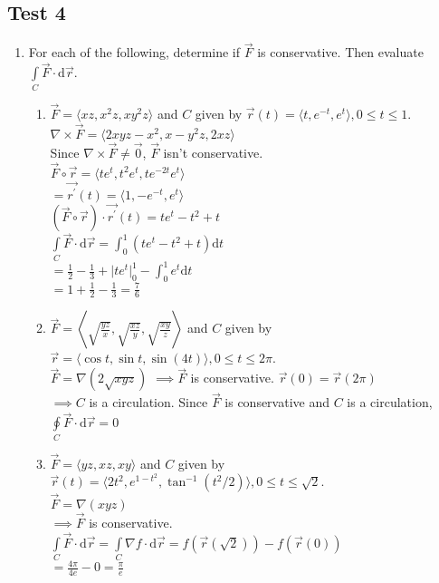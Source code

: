 \subsection{Test 4}
\begin{enumerate}
	\item For each of the following, determine if $\vec{F}$ is conservative. Then evaluate $\int\limits_{C}{\vec{F}\cdot\mathrm{d}\vec{r}}$.
	\begin{enumerate}[label=\alph*.]
		\item $\vec{F} = \langle xz, x^2z, xy^2z \rangle$ and $C$ given by $\vec{r}(t) = \langle t, e^{-t}, e^t\rangle, 0 \leq t \leq 1$.\\
		$\nabla \times \vec{F} = \langle 2xyz-x^2, x-y^2z, 2xz \rangle$\\
		Since $\nabla \times \vec{F} \neq \vec{0}$, $\vec{F}$ isn't conservative.\\
		$\vec{F}\circ\vec{r} = \langle te^t, t^2e^t, te^{-2t}e^t \rangle$\\
		$= \vec{r^\prime}(t) = \langle 1, -e^{-t}, e^t\rangle$\\
		$\left(\vec{F}\circ\vec{r}\right) \cdot \vec{r^\prime}(t) = te^t - t^2 + t$\\
		$\int\limits_{C}{\vec{F} \cdot \mathrm{d}\vec{r}} = \int_{0}^{1}{\left(te^t - t^2 + t\right)\mathrm{d}t}$\\
		$= \frac{1}{2} - \frac{1}{3} + \lvert te^t\rvert_{0}^{1} - \int_{0}^{1}{e^t\mathrm{d}t}$\\
		$= 1 + \frac{1}{2} - \frac{1}{3} = \frac{7}{6}$\\
		
		\item $\vec{F} = \left< \sqrt{\frac{yz}{x}}, \sqrt{\frac{xz}{y}}, \sqrt{\frac{xy}{z}} \right>$ and $C$ given by $\vec{r} = \langle \cos{t}, \sin{t}, \sin{(4t)} \rangle, 0 \leq t \leq 2\pi$.\\
		\indent
		$\vec{F} = \nabla(2\sqrt{xyz})$
		$\implies \vec{F}$ is conservative.
		$\vec{r}(0) = \vec{r}(2\pi)$\\
		$\implies C$ is a circulation.
		Since $\vec{F}$ is conservative and $C$ is a circulation, $\oint\limits_{C}{\vec{F} \cdot \mathrm{d}\vec{r}} = 0$\\
		
		\item $\vec{F} = \langle yz, xz, xy \rangle$ and $C$ given by $\vec{r}(t) = \langle 2t^2, e^{1-t^2}, \tan^{-1}{(t^2/2)} \rangle, 0 \leq t \leq \sqrt{2}$.\\
		$\vec{F} = \nabla(xyz)$\\
		$\implies\vec{F}$ is conservative.\\
		$\int\limits_{C}{\vec{F} \cdot \mathrm{d}\vec{r}} = \int\limits_{C}{\nabla f \cdot \mathrm{d}\vec{r}} = f(\vec{r}(\sqrt{2})) - f(\vec{r}(0))$\\
		$= \frac{4\pi}{4e} - 0 = \frac{\pi}{e}$\\
	\end{enumerate}
	

\end{enumerate}

